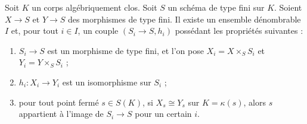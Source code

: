 \begin{lemma}
\label{lemma-countable-isos}
Soit $K$ un corps algébriquement clos.
Soit $S$ un schéma de type fini sur $K$.
Soient $X \to S$ et $Y \to S$ des morphismes de type fini.
Il existe un ensemble dénombrable $I$ et, pour tout $i \in I$, un couple
$(S_i \to S, h_i)$ possédant les propriétés suivantes :
\begin{enumerate}
\item $S_i \to S$ est un morphisme de type fini, et l'on pose
$X_i = X \times_S S_i$ et $Y_i = Y \times_S S_i$ ;
\item $h_i : X_i \to Y_i$ est un isomorphisme sur $S_i$ ;
\item pour tout point fermé $s \in S(K)$, si $X_s \cong Y_s$
sur $K = \kappa(s)$, alors $s$ appartient à l'image de $S_i \to S$
pour un certain $i$.
\end{enumerate}
\end{lemma}

